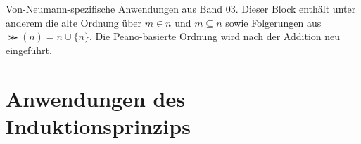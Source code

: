 \documentclass[main.tex]{subfiles}
\begin{document}
\iffalse
Von-Neumann-spezifische Anwendungen aus Band 03. Dieser Block enthält unter
anderem die alte Ordnung über \(m\in n\) und \(m\subseteq n\) sowie Folgerungen
aus \(\Succ(n)=n\cup\{n\}\). Die Peano-basierte Ordnung wird nach der Addition
neu eingeführt.
\section{Anwendungen des Induktionsprinzips}



\begin{tabproofsplitwide}
  \closeproofpartwideind






  \closeproofpartwideind

  \closeproofpartwide
\end{tabproofsplitwide}
\end{document}
